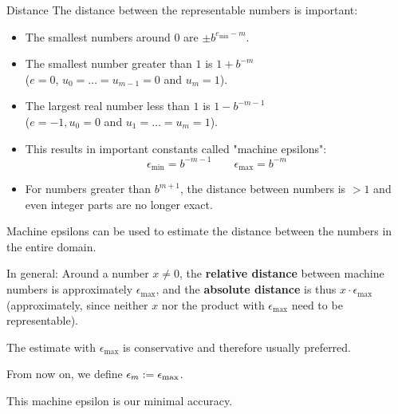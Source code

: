 \documentclass[11pt,compress,t,notes=noshow, xcolor=table]{beamer}
\begin{document}
\begin{vbframe}{Distance}
The distance between the representable numbers is important:
\begin{itemize}
 \item The smallest numbers around $0$ are $\pm b^{e_{\min}-m}$. \\[2mm]
 \item The smallest number greater than $1$ is $1+b^{-m}$ \\
 ($e = 0$, $u_0 = \hdots = u_{m-1} = 0$ and $u_m = 1$). \\[2mm]
 \item The largest real number less than $1$ is $1-b^{-m-1}$ \\
 ($e = -1, u_0 = 0$ and $u_1 = \hdots = u_m = 1$). \\[2mm]
 \item This results in important constants called
  "machine epsilons":
  $$
    \label{eq:2}
    \epsilon_{\min} = b^{-m-1} \qquad %
    \epsilon_{\max} = b^{-m}
  $$
 \item For numbers greater than $b^{m + 1}$, the distance between numbers is $> 1$ and even integer parts
   are no longer exact.

\end{itemize}

\framebreak

Machine epsilons can be used to estimate the distance between the
numbers in the entire domain.

\lz

In general: Around a number $x\ne 0$, the \textbf{relative distance} between machine numbers is approximately \textbf{$\epsilon_{\max}$}, and
the \textbf{absolute distance} is thus \textbf{$x\cdot\epsilon_{\max}$}
(approximately, since neither $x$ nor the product with $\epsilon_{\max}$
need to be representable).

\lz

The estimate with $\epsilon_{\max}$ is conservative and therefore
usually preferred.

\lz

From now on, we define
$\epsilon_m := \epsilon_{\max}$.

\lz

This machine epsilon is our minimal accuracy.





\end{vbframe}
\end{document}
